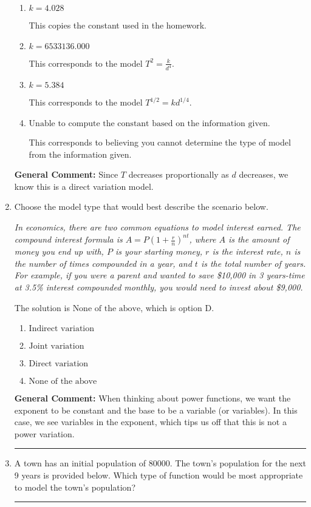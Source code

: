 \documentclass{extbook}[14pt]
\newcommand{\litem}[1]{\item #1

\rule{\textwidth}{0.4pt}}
\begin{document}
\begin{enumerate}
{\begin{enumerate}[label=\Alph*.]
* This is the correct option corresponding to the model $T^{2} = k d^{4}$.
\item \( k = 4.028 \)

This copies the constant used in the homework.
\item \( k = 6533136.000 \)

This corresponds to the model $T^{2} = \frac{k}{d^{4}}$.
\item \( k = 5.384 \)

This corresponds to the model $T^{1/2} = k d^{1/4}$.
\item \( \text{Unable to compute the constant based on the information given.} \)

This corresponds to believing you cannot determine the type of model from the information given.
\end{enumerate}

\textbf{General Comment:} Since $T$ decreases proportionally as $d$ decreases, we know this is a direct variation model.
}
\litem{
Choose the model type that would best describe the scenario below.

\begin{center}
    \textit{ In economics, there are two common equations to model interest earned. The compound interest formula is $A = P (1 + \frac{r}{n})^{nt}$, where $A$ is the amount of money you end up with, $P$ is your starting money, $r$ is the interest rate, $n$ is the number of times compounded in a year, and $t$ is the total number of years. For example, if you were a parent and wanted to save \$10,000 in 3 years-time at 3.5\% interest compounded monthly, you would need to invest about \$9,000. }
\end{center}
The solution is \( \text{None of the above} \), which is option D.\begin{enumerate}[label=\Alph*.]
\item \( \text{Indirect variation} \)


\item \( \text{Joint variation} \)


\item \( \text{Direct variation} \)


\item \( \text{None of the above} \)


\end{enumerate}

\textbf{General Comment:} When thinking about power functions, we want the exponent to be constant and the base to be a variable (or variables). In this case, we see variables in the exponent, which tips us off that this is not a power variation.
}
\litem{
A town has an initial population of 80000. The town's population for the next 9 years is provided below. Which type of function would be most appropriate to model the town's population?


}
\end{enumerate}
\end{document}
